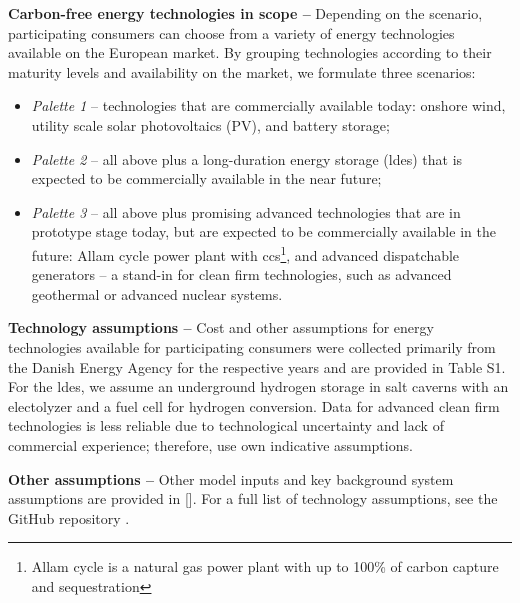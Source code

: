 \textbf{Carbon-free energy technologies in scope --} Depending on the scenario, participating consumers can choose from a variety of energy technologies available on the European market. By grouping technologies according to their maturity levels and availability on the market, we formulate three scenarios:

\begin{itemize}[-]
    \item \textit{Palette 1} -- technologies that are commercially available today: onshore wind, utility scale solar photovoltaics (\gls{PV}), and battery storage;
    \item \textit{Palette 2} -- all above plus a long-duration energy storage (\gls{ldes}) that is expected to be commercially available in the near future; 
    \item \textit{Palette 3} -- all above plus promising advanced technologies that are in prototype stage today, but are expected to be commercially available in the future: Allam cycle power plant with \gls{ccs}\footnote{Allam cycle is a natural gas power plant with up to 100\% of carbon capture and sequestration}, and advanced dispatchable generators -- a stand-in for clean firm technologies, such as advanced geothermal or advanced nuclear systems.
\end{itemize}

\textbf{Technology assumptions --} Cost and other assumptions for energy technologies available for participating consumers were collected primarily from the Danish Energy Agency \cite{DEA-technologydata} for the respective years and are provided in Table S1. 
For the \gls{ldes}, we assume an underground hydrogen storage in salt caverns with an electolyzer and a fuel cell for hydrogen conversion. 
Data for advanced clean firm technologies is less reliable due to technological uncertainty and lack of commercial experience; therefore, use own indicative assumptions.

\textbf{Other assumptions --} Other model inputs and key background system assumptions are provided in []. For a full list of technology assumptions, see the GitHub repository \cite{github-247CFEpaper}.
